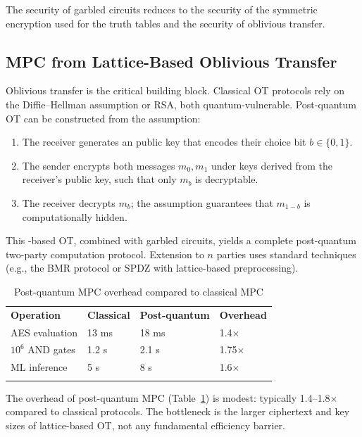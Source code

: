 The security of garbled circuits reduces to the security of the symmetric encryption used for the truth tables and the security of oblivious transfer.


\subsection{MPC from Lattice-Based Oblivious Transfer}
\label{subsec:lattice-ot}

Oblivious transfer is the critical building block.  Classical OT protocols rely on the Diffie--Hellman assumption or RSA, both quantum-vulnerable.  Post-quantum OT can be constructed from the \lwe{} assumption:

\begin{enumerate}
\item The receiver generates an \lwe{} public key that encodes their choice bit $b \in \{0,1\}$.
\item The sender encrypts both messages $m_0, m_1$ under keys derived from the receiver's public key, such that only $m_b$ is decryptable.
\item The receiver decrypts $m_b$; the \lwe{} assumption guarantees that $m_{1-b}$ is computationally hidden.
\end{enumerate}

This \lwe{}-based OT, combined with garbled circuits, yields a complete post-quantum two-party computation protocol.  Extension to $n$ parties uses standard techniques (e.g., the BMR protocol or SPDZ with lattice-based preprocessing).

\begin{table}[t]
\caption{Post-quantum MPC overhead compared to classical MPC}
\label{tab:pq-mpc}
\begin{tabular}{p{3.5cm}p{2.5cm}p{2.5cm}p{2cm}}
\hline\noalign{\smallskip}
\textbf{Operation} & \textbf{Classical} & \textbf{Post-quantum} & \textbf{Overhead} \\
\noalign{\smallskip}\svhline\noalign{\smallskip}
AES evaluation & 13 ms & 18 ms & 1.4$\times$ \\
$10^6$ AND gates & 1.2 s & 2.1 s & 1.75$\times$ \\
ML inference & 5 s & 8 s & 1.6$\times$ \\
\noalign{\smallskip}\hline
\end{tabular}
\end{table}

The overhead of post-quantum MPC (Table~\ref{tab:pq-mpc}) is modest: typically 1.4--1.8$\times$ compared to classical protocols.  The bottleneck is the larger ciphertext and key sizes of lattice-based OT, not any fundamental efficiency barrier.


